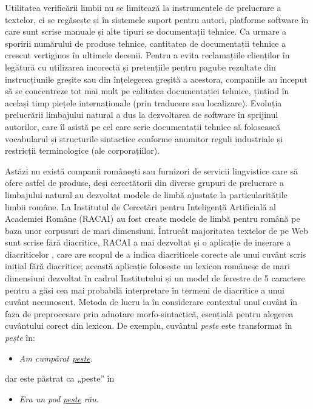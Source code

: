 \begin{multicols}{2}
Utilitatea verificării limbii nu se limitează la instrumentele de prelucrare a textelor, ci se regăsește și în sistemele suport pentru autori, platforme software în care sunt scrise manuale și alte tipuri se documentații tehnice. Ca urmare a sporirii numărului de produse tehnice, cantitatea de documentații tehnice a crescut vertiginos în ultimele decenii. Pentru a evita reclamațiile clienților în legătură cu utilizarea incorectă și pretențiile pentru pagube rezultate din instrucțiunile greșite sau din înțelegerea greșită a acestora, companiile au început să se concentreze tot mai mult pe calitatea documentației tehnice, țintind în același timp piețele internaționale (prin traducere sau localizare). Evoluția prelucrării limbajului natural a dus la dezvoltarea de software în sprijinul autorilor, care îl asistă pe cel care scrie documentații tehnice să folosească vocabularul și structurile sintactice conforme anumitor reguli industriale și restricții terminologice (ale corporațiilor).

Astăzi nu există companii românești sau furnizori de servicii lingvistice care să ofere astfel de produse, deși cercetătorii din diverse grupuri de prelucrare a limbajului natural au dezvoltat modele de limbă ajustate la particularitățile limbii române. La Institutul de Cercetări pentru Inteligență Artificială al Academiei Române (RACAI) au fost create modele de limbă pentru română pe baza unor corpusuri de mari dimensiuni. Întrucât majoritatea textelor de pe Web sunt scrise fără diacritice, RACAI a mai dezvoltat și o aplicație de inserare a diacriticelor \cite{DIAC}, care are scopul de a indica diacriticele corecte ale unui cuvânt scris inițial fără diacritice; această aplicație folosește un lexicon românesc de mari dimensiuni dezvoltat în cadrul Institutului și un model de ferestre de 5 caractere pentru a găsi cea mai probabilă interpretare în termeni de diacritice a unui cuvânt necunoscut. Metoda de lucru ia în considerare contextul unui cuvânt în faza de preprocesare prin adnotare morfo-sintactică, esențială pentru alegerea cuvântului corect din lexicon. De exemplu, cuvântul \textit{peste} este transformat în \textit{pește} în:

\begin{itemize}
\item \textit{Am cumpărat \underline{peste}.}
\end{itemize}

dar este păstrat ca „peste” în

\begin{itemize}
\item \textit{Era un pod \underline{peste} râu. }
\end{itemize}


\end{multicols}
